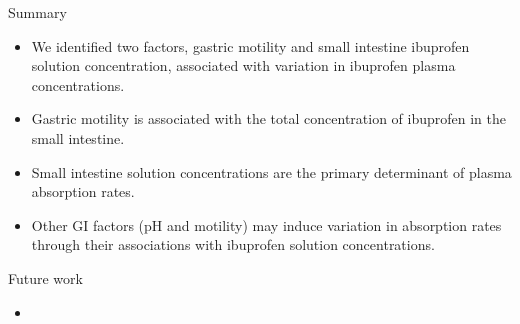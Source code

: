 \documentclass[]{beamer}
\begin{document}
\begin{frame}{Summary}

\begin{itemize}
	\setlength\itemsep{1.25em}

	\item We identified two factors, gastric motility and small intestine ibuprofen solution concentration, associated with variation in ibuprofen plasma concentrations.

	\item Gastric motility is associated with the total concentration of ibuprofen in the small intestine.

	\item Small intestine solution concentrations are the primary determinant of plasma absorption rates.

	\item Other GI factors (pH and motility) may induce variation in absorption rates through their associations with ibuprofen solution concentrations.

\end{itemize}

\end{frame}

\begin{frame}{Future work}

\begin{itemize}
	\setlength\itemsep{1.25em}
	\item 
\end{itemize}

\end{frame}
\end{document}
